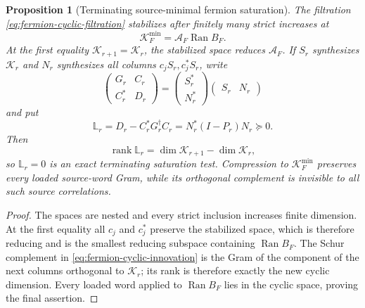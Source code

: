 \documentclass[11pt]{article}
\numberwithin{equation}{section}
\newtheorem{proposition}[theorem]{Proposition}
\theoremstyle{definition}
\theoremstyle{remark}
\newcommand{\N}{\mathbb N}
\newcommand{\C}{\mathbb C}
\newcommand{\rank}{\operatorname{rank}}
\newcommand{\Ran}{\operatorname{Ran}}
\begin{document}
\begin{proposition}[Terminating source-minimal fermion saturation]
\label{thm:fermion-source-saturation}
The filtration \eqref{eq:fermion-cyclic-filtration} stabilizes after finitely
many strict increases at
\begin{equation}
 \mathcal K_F^{\min}=\mathcal A_F\Ran B_F.
 \label{eq:fermion-minimal-carrier}
\end{equation}
At the first equality $\mathcal K_{r+1}=\mathcal K_r$, the stabilized space
reduces $\mathcal A_F$.  If $S_r$ synthesizes $\mathcal K_r$ and $N_r$
synthesizes all columns $c_jS_r,c_j^*S_r$, write
\[
 \begin{pmatrix}G_r&C_r\\C_r^*&D_r\end{pmatrix}
 =\begin{pmatrix}S_r^*\\N_r^*\end{pmatrix}
  \begin{pmatrix}S_r&N_r\end{pmatrix}
\]
and put
\begin{equation}
 \mathbb L_r=D_r-C_r^*G_r^\dagger C_r
 =N_r^*(I-P_r)N_r\succeq0.
 \label{eq:fermion-cyclic-innovation}
\end{equation}
Then
\begin{equation}
 \rank\mathbb L_r
 =\dim\mathcal K_{r+1}-\dim\mathcal K_r,
 \label{eq:fermion-cyclic-rank}
\end{equation}
so $\mathbb L_r=0$ is an exact terminating saturation test.  Compression to
$\mathcal K_F^{\min}$ preserves every loaded source-word Gram, while its
orthogonal complement is invisible to all such source correlations.
\end{proposition}

\begin{proof}
The spaces are nested and every strict inclusion increases finite dimension.
At the first equality all $c_j$ and $c_j^*$ preserve the stabilized space,
which is therefore reducing and is the smallest reducing subspace containing
$\Ran B_F$.  The Schur complement in
\eqref{eq:fermion-cyclic-innovation} is the Gram of the component of the next
columns orthogonal to $\mathcal K_r$; its rank is therefore exactly the new
cyclic dimension.  Every loaded word applied to $\Ran B_F$ lies in the cyclic
space, proving the final assertion.
\end{proof}
\end{document}
